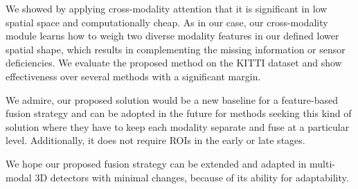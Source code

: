 \documentclass[10pt,twocolumn,letterpaper]{article}
\begin{document}
We showed by applying cross-modality attention that it is significant in low spatial space and computationally cheap.
As in our case, our cross-modality module learns how to weigh two diverse modality features in our defined lower spatial shape, which results in complementing the missing information or sensor deficiencies. We evaluate the proposed method on the KITTI dataset and show effectiveness over several methods with a significant margin. 

We admire, our proposed solution would be a new baseline for a feature-based fusion strategy and can be adopted in the future for methods seeking this kind of solution where they have to keep each modality separate and fuse at a particular level. Additionally, it does not require ROIs in the early or late stages. 

We hope our proposed fusion strategy can be extended and adapted in multi-modal 3D detectors with minimal changes, because of its ability for adaptability.


{\small \newpage \newpage


}
\end{document}
